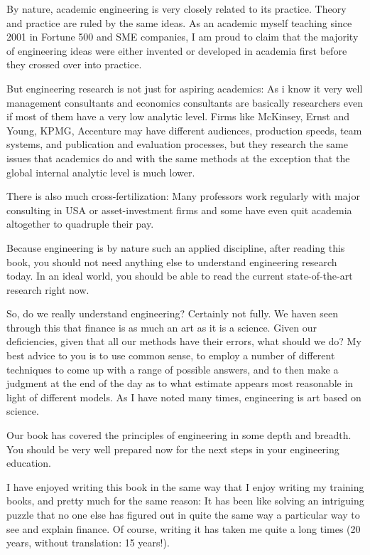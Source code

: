 \documentclass[12pt,a4paper,twoside,openright]{report}
\newcounter{def}
\theoremstyle{definition}
\theoremstyle{itexmp}
\numberwithin{equation}{section}
\begin{document}
	By nature, academic engineering is very closely related to its practice. Theory and practice are ruled by the same ideas. As an academic myself teaching since 2001 in Fortune 500 and SME companies, I am proud to claim that the majority of engineering ideas were either invented or developed in academia first before they crossed over into practice.
	
	But engineering research is not just for aspiring academics: As i know it very well management consultants and economics consultants are basically researchers even if most of them have a very low analytic level. Firms like McKinsey, Ernst and Young, KPMG, Accenture may have different audiences, production speeds, team systems, and publication and evaluation processes, but they research the same issues that academics do and with the same methods at the exception that the global internal analytic level is much lower.

	There is also much cross-fertilization: Many professors work regularly with major consulting in USA or asset-investment firms and some have even quit academia altogether to quadruple their pay.

	Because engineering is by nature such an applied discipline, after reading this book,  you should not need anything else to understand engineering research today. In an ideal world, you should be able to read the current state-of-the-art research right now.
	
	So, do we really understand engineering? Certainly not fully. We haven seen through this that finance is as much an art as it is a science. Given our deficiencies, given that all our methods have their errors, what should we do? My best advice to you is to use common sense, to employ a number of different techniques to come up with a range of possible answers, and to then make a judgment at the end of the day as to what estimate appears most reasonable in light of different models. As I have noted many times, engineering is art based on science.
	
	Our book has covered the principles of engineering in some depth and breadth. You should be very well prepared now for the next steps in your engineering education.
	
	I have enjoyed writing this book in the same way that I enjoy writing my training books, and pretty much for the same reason: It has been like solving an intriguing puzzle that no one else has figured out in quite the same way a particular way to see and explain finance. Of course, writing it has taken me quite a long times (20 years, without translation: 15 years!).
	
\end{document}
